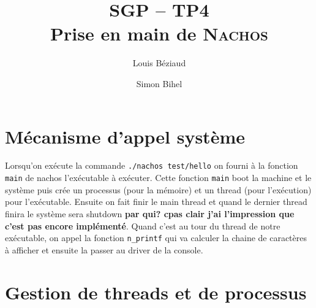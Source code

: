 \documentclass[a4paper,11pt,french]{article}
\title{SGP -- TP4\\Prise en main de \textsc{Nachos}}
\author{Louis Béziaud \and Simon Bihel}
\begin{document}
\maketitle

\section{Mécanisme d'appel système}
Lorsqu'on exécute la commande \texttt{./nachos test/hello} on fourni à la fonction \texttt{main} de nachos l'exécutable à exécuter. Cette fonction \texttt{main} boot la machine et le système puis crée un processus (pour la mémoire) et un thread (pour l'exécution) pour l'exécutable. Ensuite on fait finir le main thread et quand le dernier thread finira le système sera shutdown {\bf par qui? cpas clair j'ai l'impression que c'est pas encore implémenté}. Quand c'est au tour du thread de notre exécutable, on appel la fonction \texttt{n\_printf} qui va calculer la chaine de caractères à afficher et ensuite la passer au driver de la console.

\section{Gestion de threads et de processus}
\end{document}
